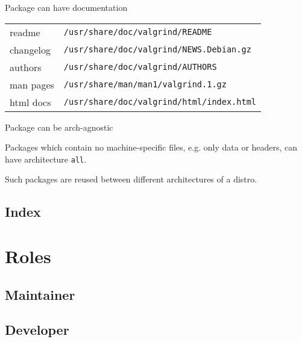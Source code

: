 \documentclass{beamer}
\begin{document}
\begin{frame}[fragile]{Package can have documentation}
    \begin{block}{}
        \renewcommand{\arraystretch}{1.5}
        \begin{tabular}{l l}
            readme & \small\verb|/usr/share/doc/valgrind/README| \\
            changelog & \small\verb|/usr/share/doc/valgrind/NEWS.Debian.gz| \\
            authors & \small\verb|/usr/share/doc/valgrind/AUTHORS| \\
            man pages & \small\verb|/usr/share/man/man1/valgrind.1.gz| \\
            html docs & \small\verb|/usr/share/doc/valgrind/html/index.html| \\
        \end{tabular}
    \end{block}
\end{frame}

\begin{frame}[fragile]{Package can be arch-agnostic}
    \begin{block}{}
        Packages which contain no machine-specific files,
        e.g. only data or headers, can have architecture \verb|all|.
    \end{block}
    \begin{block}{}
        Such packages are reused
        between different architectures of a distro.
    \end{block}
\end{frame}

\subsection{Index}

\begin{frame}
\end{frame}

\section{Roles}

\subsection{Maintainer}

\begin{frame}
\end{frame}

\subsection{Developer}

\begin{frame}
\end{frame}
\end{document}

